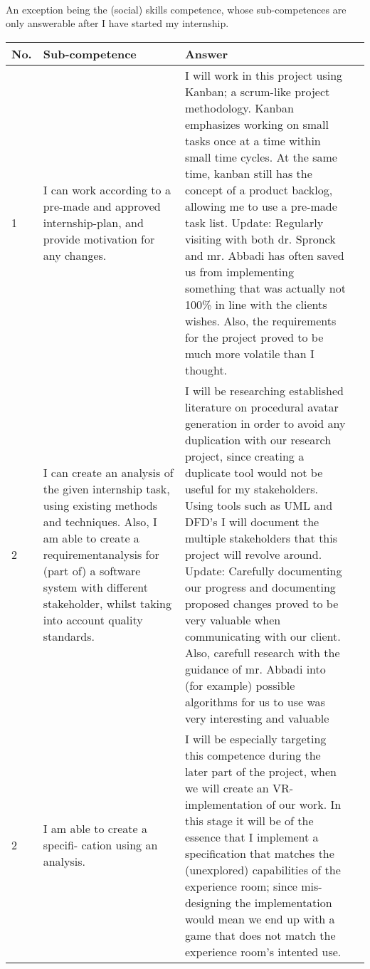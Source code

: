 \documentclass[11pt]{article}
\begin{document}
~\\
An exception being the (social) skills competence, whose sub-competences are only answerable
after I have started my internship.

\newpage
\begin{tabularx}{400pt}{|l|X|X|X|}
\hline No. & Sub-competence & Answer \\
\hline 1 & I can work according to
a pre-made and approved
internship-plan, and provide
motivation for any changes. & I will work in this project using Kanban; a scrum-like
project methodology. Kanban emphasizes working on
small tasks once at a time within small time cycles.
At the same time, kanban still has the concept of a
product backlog, allowing me to use a pre-made task
list. Update: Regularly visiting with both dr. Spronck and mr. Abbadi has often saved us from implementing something that was actually not 100\% in line with the clients wishes. Also, the requirements for the project proved to be much more volatile than I thought.\\
\hline 2 &  I can create an analysis of
the given internship task,
using existing methods and
techniques. Also, I am
able to create a requirementanalysis
for (part of) a software
system with different
stakeholder, whilst taking into
account quality standards. & I will be researching established literature on procedural
avatar generation in order to avoid any duplication
with our research project, since creating a duplicate
tool would not be useful for my stakeholders.
Using tools such as UML and DFD’s I will document
the multiple stakeholders that this project will revolve
around. Update: Carefully documenting our progress and documenting proposed changes proved to be very valuable when communicating with our client. Also, carefull research with the guidance of mr. Abbadi into (for example) possible algorithms for us to use was very interesting and valuable\\
\hline 2 & I am able to create a specifi-
cation using an analysis. & I will be especially targeting this competence during
the later part of the project, when we will create an
VR-implementation of our work. In this stage it will
be of the essence that I implement a specification that
matches the (unexplored) capabilities of the experience
room; since mis-designing the implementation
would mean we end up with a game that does not
match the experience room’s intented use. \\ \hline
\end{tabularx}
\end{document}
